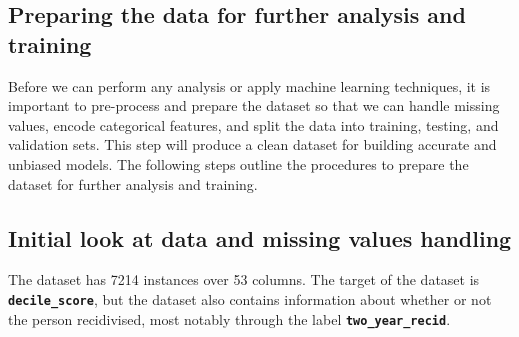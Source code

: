 




\subsection{Preparing the data for further analysis and training}

Before we can perform any analysis or apply machine learning techniques, it is important to pre-process and prepare the dataset so that we can handle missing values, encode categorical features, and split the data into training, testing, and validation sets. This step will produce a clean dataset for building accurate and unbiased models. The following steps outline the procedures to prepare the dataset for further analysis and training.


\subsection{Initial look at data and missing values handling}

The dataset has 7214 instances over 53 columns. The target of the dataset is \textbf{\texttt{decile\_score}}, but the dataset also contains information about whether or not the person recidivised, most notably through the label \textbf{\texttt{two\_year\_recid}}. 

